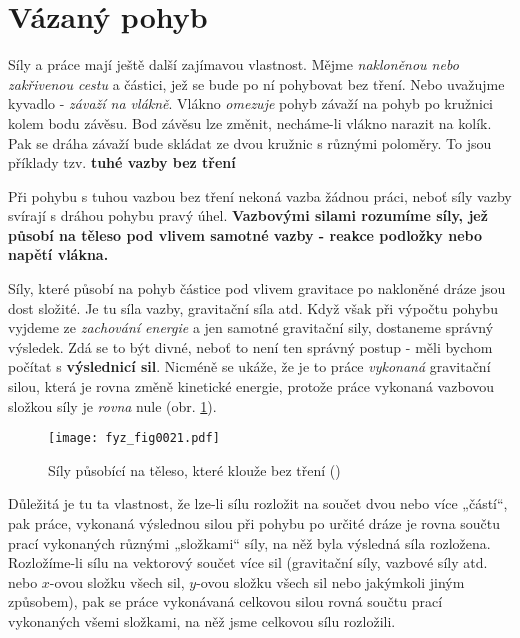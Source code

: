  \section{Vázaný pohyb}
    Síly a práce mají ještě další zajímavou vlastnost. Mějme \emph{nakloněnou nebo zakřivenou 
    cestu} a částici, jež se bude po ní pohybovat bez tření. Nebo uvažujme kyvadlo - \emph{závaží 
    na vlákně}. Vlákno \emph{omezuje} pohyb závaží na pohyb po kružnici kolem bodu závěsu. Bod 
    závěsu lze změnit, necháme-li vlákno narazit na kolík. Pak se dráha závaží bude skládat ze dvou 
    kružnic s různými poloměry. To jsou příklady tzv. \textbf{tuhé vazby bez tření}
    
    Při pohybu s tuhou vazbou bez tření nekoná vazba žádnou práci, neboť síly vazby svírají s 
    dráhou pohybu pravý úhel. \textbf{Vazbovými silami rozumíme síly, jež působí na těleso pod 
    vlivem samotné vazby - reakce podložky nebo napětí vlákna.}
    
    Síly, které působí na pohyb částice pod vlivem gravitace po nakloněné dráze jsou dost složité. 
    Je tu síla vazby, gravitační síla atd. Když však při výpočtu pohybu vyjdeme ze \emph{zachování 
    energie} a jen samotné gravitační sily, dostaneme správný výsledek. Zdá se to být divné, neboť 
    to není ten správný postup - měli bychom počítat s \textbf{výslednicí sil}. Nicméně se ukáže, 
    že je to práce \emph{vykonaná} gravitační silou, která je rovna změně kinetické energie, 
    protože práce vykonaná vazbovou složkou síly je \emph{rovna} nule (obr. \ref{fyz:fig0021}).
  
    \begin{figure}[ht!]  %
      \centering
      \texttt{[image: fyz\_fig0021.pdf]}
      \caption{Síly působící na těleso, které klouže bez tření (\cite[s.~201]{Feynman01})}
      \label{fyz:fig0021}
    \end{figure}
    Důležitá je tu ta vlastnost, že lze-li sílu rozložit na součet dvou nebo více „částí“, pak 
    práce, vykonaná výslednou silou při pohybu po určité dráze je rovna součtu prací vykonaných 
    různými „složkami“ síly, na něž byla výsledná síla rozložena. Rozložíme-li sílu na vektorový 
    součet více sil (gravitační síly, vazbové síly atd. nebo \(x\)-ovou složku všech sil, 
    \(y\)-ovou složku všech sil nebo jakýmkoli jiným způsobem), pak se práce vykonávaná celkovou 
    silou rovná součtu prací vykonaných všemi složkami, na něž jsme celkovou sílu rozložili.
  
